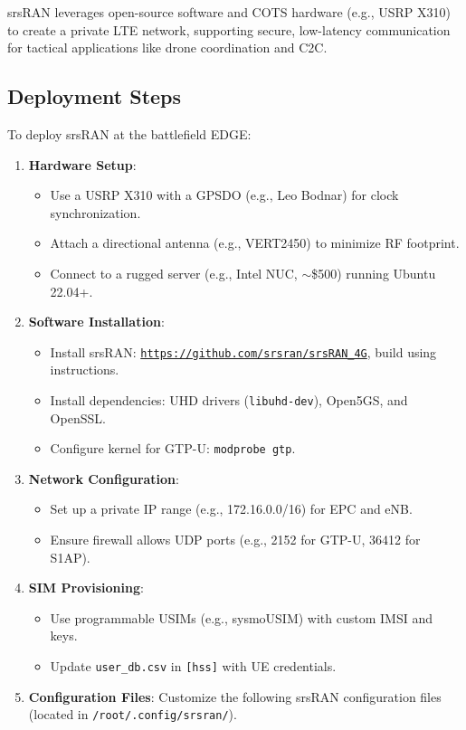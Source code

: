 \documentclass{article}
\begin{document}
srsRAN leverages open-source software and COTS hardware (e.g., USRP X310) to create a
private LTE network, supporting secure, low-latency communication for tactical applications
like drone coordination and C2C.

\subsection{Deployment Steps}
To deploy srsRAN at the battlefield EDGE:
\begin{enumerate}
\item \textbf{Hardware Setup}:
\begin{itemize}
\item Use a USRP X310 with a GPSDO (e.g., Leo Bodnar) for clock synchronization.
\item Attach a directional antenna (e.g., VERT2450) to minimize RF footprint.
\item Connect to a rugged server (e.g., Intel NUC, $\sim$\$500) running Ubuntu 22.04+.
\end{itemize}
\item \textbf{Software Installation}:
\begin{itemize}
\item Install srsRAN: \texttt{\url{https://github.com/srsran/srsRAN_4G}}, build using instructions.
\item Install dependencies: UHD drivers (\texttt{libuhd-dev}), Open5GS, and OpenSSL.
\item Configure kernel for GTP-U: \texttt{modprobe gtp}.
\end{itemize}
\item \textbf{Network Configuration}:
\begin{itemize}
\item Set up a private IP range (e.g., 172.16.0.0/16) for EPC and eNB.
\item Ensure firewall allows UDP ports (e.g., 2152 for GTP-U, 36412 for S1AP).
\end{itemize}
\item \textbf{SIM Provisioning}:
\begin{itemize}
\item Use programmable USIMs (e.g., sysmoUSIM) with custom IMSI and keys.
\item Update \texttt{user\_db.csv} in \texttt{[hss]} with UE credentials.
\end{itemize}
\item \textbf{Configuration Files}: Customize the following srsRAN configuration files (located in \texttt{/root/.config/srsran/}).
\end{enumerate}
\end{document}
